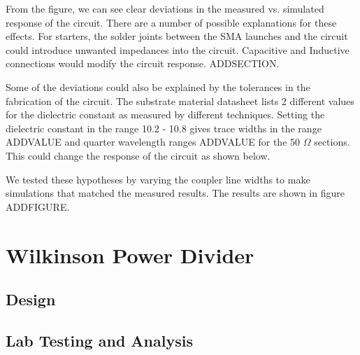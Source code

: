 \documentclass[twocolumn, aps, apl]{revtex4-1}
\begin{document}
From the figure, we can see clear deviations in the measured vs. simulated response of the circuit. There are a number of possible explanations for these effects. For starters, the solder joints between the SMA launches and the circuit could introduce unwanted impedances into the circuit. Capacitive and Inductive connections would modify the circuit response. ADDSECTION.

Some of the deviations could also be explained by the tolerances in the fabrication of the circuit. The substrate material datasheet lists 2 different values for the dielectric constant as measured by different techniques. Setting the dielectric constant in the range 10.2 - 10.8 gives trace widths in the range ADDVALUE and quarter wavelength ranges ADDVALUE for the 50 $\Omega$ sections. This could change the response of the circuit as shown below. 

We tested these hypotheses by varying the coupler line widths to make simulations that matched the measured results. The results are shown in figure ADDFIGURE. 



\FloatBarrier

\section*{Wilkinson Power Divider}

\subsection{Design}

\subsection{Lab Testing and Analysis}


\end{document}
